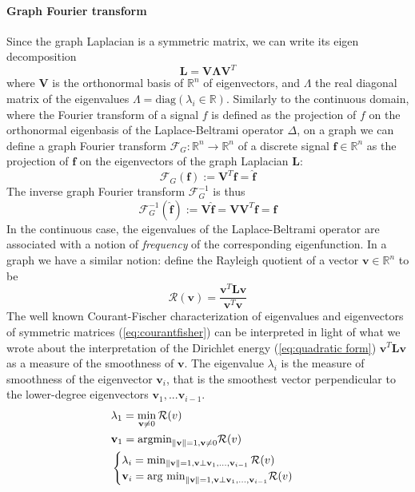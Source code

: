 \paragraph{Graph Fourier transform}
Since the graph Laplacian is a symmetric matrix, we can write its eigen decomposition \cite{Strang}
$$
\mathbf L = \mathbf V\mathbf \Lambda\mathbf V^T
$$
 where $\mathbf V$ is the orthonormal basis of $\mathbb R^n$ of eigenvectors, and $\Lambda$ the real diagonal matrix of the eigenvalues $\Lambda = \text{diag}(\lambda_i\in \mathbb R)$. Similarly to the continuous domain, where the Fourier transform of a signal $f$ is defined as the projection of $f$ on the orthonormal eigenbasis of the Laplace-Beltrami operator $\Delta$, on a graph we can define a graph Fourier transform $\mathcal F_G: \mathbb R^n\to\mathbb R^n$ of a discrete signal $\mathbf f\in\mathbb R^n$ as the projection of $\mathbf f$ on the eigenvectors of the graph Laplacian $\mathbf L$:
\begin{equation}\label{eq:graph fourier}
\mathcal F_G(\mathbf f) := \mathbf V^T\mathbf f = \hat{\mathbf f}
\end{equation}
The inverse graph Fourier transform $\mathcal F^{-1}_G$ is thus 
\begin{equation}\label{eq:graph fourier inverse}
\mathcal F^{-1}_G(\hat{\mathbf f}) := \mathbf V \hat{\mathbf f} = \mathbf V\mathbf V^T\mathbf f = {\mathbf f}
\end{equation}
In the continuous case, the eigenvalues of the Laplace-Beltrami operator are associated with a notion of \textit{frequency} of the corresponding eigenfunction. In a graph we have a similar notion: define the Rayleigh quotient of a vector $\mathbf v \in \mathbb R^n$ to be
\begin{equation}\label{eq:Rayleigh}
	\mathcal R(\mathbf v) = \frac{\mathbf v^T\mathbf L \mathbf v}{\mathbf v^T\mathbf v}
\end{equation}
The well known \cite{Strang} Courant-Fischer characterization of eigenvalues and eigenvectors of symmetric matrices (\ref{eq:courantfisher}) can be interpreted in light of what we wrote about the interpretation of the Dirichlet energy (\ref{eq:quadratic form}) $\mathbf v^T \mathbf L \mathbf v$ as a measure of the smoothness of $\mathbf v$. The eigenvalue $\lambda_i$ is the measure of smoothness of the eigenvector $\mathbf v_i$, that is the smoothest vector perpendicular to the lower-degree eigenvectors $\mathbf v_1, ... \mathbf v_{i-1}$.
\begin{equation}\label{eq:courantfisher}
	\begin{aligned} 
	&\lambda_1 = \min_{\mathbf v\neq 0} \mathcal R(v)\\
	&\mathbf v_1 = \text{argmin}_{\left\lVert\mathbf v\right\rVert = 1, \mathbf v\neq 0} \mathcal R(v)\\
	&\begin{cases}
	\lambda_i = \min_{\left\lVert\mathbf v\right\rVert = 1, \mathbf v\perp \mathbf v_1, ..., \mathbf v_{i-1}} \mathcal R(v)\\
	\mathbf v_i = \text{arg min}_{\left\lVert\mathbf v\right\rVert = 1, \mathbf v\perp \mathbf v_1, ..., \mathbf v_{i-1}}  \mathcal R(v)
	\end{cases}
	\end{aligned}	
\end{equation}
